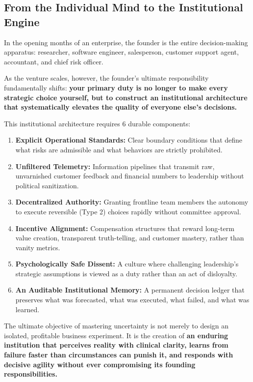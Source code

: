 \subsection{From the Individual Mind to the Institutional Engine}

In the opening months of an enterprise, the founder is the entire decision-making apparatus: researcher, software engineer, salesperson, customer support agent, accountant, and chief risk officer.

As the venture scales, however, the founder's ultimate responsibility fundamentally shifts: \textbf{your primary duty is no longer to make every strategic choice yourself, but to construct an institutional architecture that systematically elevates the quality of everyone else's decisions.}

This institutional architecture requires 6 durable components:
\begin{enumerate}[leftmargin=12pt,itemsep=2pt,topsep=1pt,parsep=0pt]
  \item \textbf{Explicit Operational Standards:} Clear boundary conditions that define what risks are admissible and what behaviors are strictly prohibited.
  \item \textbf{Unfiltered Telemetry:} Information pipelines that transmit raw, unvarnished customer feedback and financial numbers to leadership without political sanitization.
  \item \textbf{Decentralized Authority:} Granting frontline team members the autonomy to execute reversible (Type 2) choices rapidly without committee approval.
  \item \textbf{Incentive Alignment:} Compensation structures that reward long-term value creation, transparent truth-telling, and customer mastery, rather than vanity metrics.
  \item \textbf{Psychologically Safe Dissent:} A culture where challenging leadership's strategic assumptions is viewed as a duty rather than an act of disloyalty.
  \item \textbf{An Auditable Institutional Memory:} A permanent decision ledger that preserves what was forecasted, what was executed, what failed, and what was learned.
\end{enumerate}

The ultimate objective of mastering uncertainty is not merely to design an isolated, profitable business experiment. It is the creation of \textbf{an enduring institution that perceives reality with clinical clarity, learns from failure faster than circumstances can punish it, and responds with decisive agility without ever compromising its founding responsibilities.}

